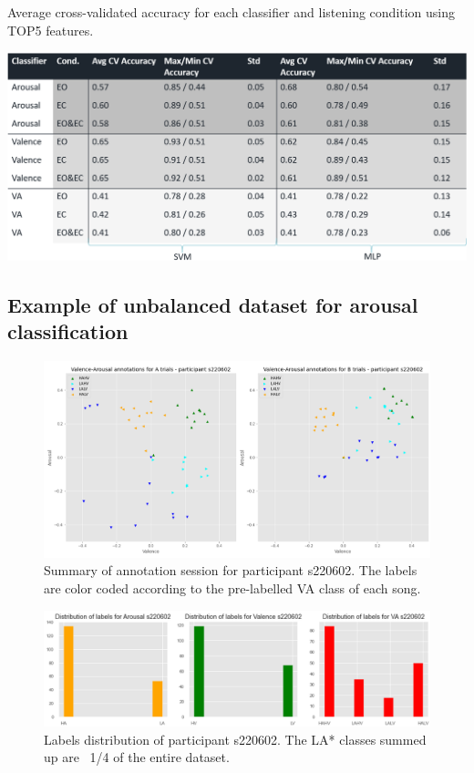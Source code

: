\begin{table}[h!]
  \caption{Average cross-validated accuracy for each classifier and listening condition using TOP5 features.}
  \label{tbl:top5_cv_experiment}
  \includegraphics[width=\linewidth]{img/appendix/top5_cv_experiment.png}
\end{table}


\subsection{Example of unbalanced dataset for arousal classification}
\label{sec:appendix_A3.3.1}

\begin{figure}[!htb]
\includegraphics[width=16cm]{img/appendix/arousal_unbalanced.png}
\centering
\caption{Summary of annotation session for participant s220602. The labels are color coded according to the pre-labelled 
VA class of each song.}\label{fig:arousal_unbalanced}
\end{figure}

\begin{figure}[!htb]
\includegraphics[width=16cm]{img/appendix/arousal_unbalanced_distribution.png}
\centering
\caption{Labels distribution of participant s220602. The LA* classes summed up are ~1/4 of the entire dataset.}\label{fig:arousal_unbalanced_distribution}
\end{figure}

